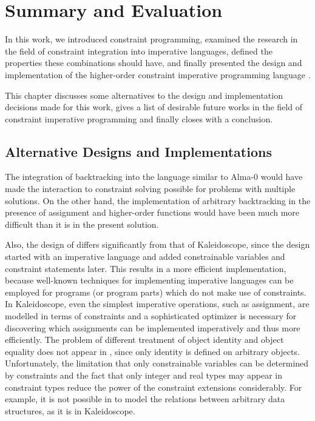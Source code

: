 
\chapter{Summary and Evaluation}
\label{cha:summary}

In this work, we introduced constraint programming, examined the
research in the field of constraint integration into imperative
languages, defined the properties these combinations should have, and
finally presented the design and implementation of the higher-order
constraint imperative programming language \turtle{}.

This chapter discusses some alternatives to the design and
implementation decisions made for this work, gives a list of desirable
future works in the field of constraint imperative programming and
finally closes with a conclusion.

\section{Alternative Designs and Implementations}
\label{sec:alternatives}

The integration of backtracking into the language similar to Alma-0
would have made the interaction to constraint solving possible for
problems with multiple solutions.  On the other hand, the
implementation of arbitrary backtracking in the presence of assignment
and higher-order functions would have been much more difficult than it
is in the present solution.

Also, the design of \turtle{} differs significantly from that of
Kaleidoscope, since the \turtle{} design started with an imperative
language and added constrainable variables and constraint statements
later.  This results in a more efficient implementation, because
well-known techniques for implementing imperative languages can be
employed for programs (or program parts) which do not make use of
constraints.  In Kaleidoscope, even the simplest imperative
operations, such as assignment, are modelled in terms of constraints
and a sophisticated optimizer is necessary for discovering which
assignments can be implemented imperatively and thus more efficiently.
The problem of different treatment of object identity and object
equality does not appear in \turtle{}, since only identity is defined
on arbitrary objects.  Unfortunately, the limitation that only
constrainable variables can be determined by constraints and the fact
that only integer and real types may appear in constraint types reduce
the power of the constraint extensions considerably.  For example, it
is not possible in \turtle{} to model the relations between arbitrary
data structures, as it is in Kaleidoscope.

